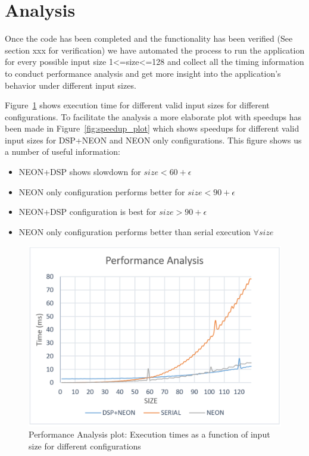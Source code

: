 \newpage
\section{Analysis}

Once the code has been completed and the functionality has been verified (See section xxx for verification) we have automated the process to run the application for every possible input size 1<=size<=128 and collect all the timing information to conduct performance analysis and get more insight into the application's behavior under different input sizes.

Figure~\ref{fig:perf_plot} shows execution time for different valid input sizes for different configurations. To facilitate the analysis a more elaborate plot with speedups has been made in Figure~\ref{fig:speedup_plot} which shows speedups for different valid input sizes for DSP+NEON and NEON only configurations. This figure shows us a number of useful information:
\begin{itemize}
\item{NEON+DSP shows slowdown for $size < 60 + \epsilon$}
\item{NEON only configuration performs better for $size < 90 + \epsilon$}
\item{NEON+DSP configuration is best for $size >90 + \epsilon$}
\item{NEON only configuration performs better than serial execution $ \forall size$}

\end{itemize}



\begin{figure}[h!]
\includegraphics[width=\textwidth]{analysis/perf_plot}
\caption{Performance Analysis plot: Execution times as a function of input size for different configurations}
\label{fig:perf_plot}
\end{figure}


